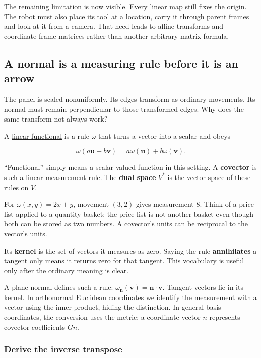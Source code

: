 The remaining limitation is now visible. Every linear map still fixes the origin. The robot must also place its tool at a location, carry it through parent frames and look at it from a camera. That need leads to affine transforms and coordinate-frame matrices rather than another arbitrary matrix formula.

\subsection{A normal is a measuring rule before it is an arrow}\label{01-foundations-i-ch018-a-normal-is-a-measuring-rule-before-it-is-an-arrow}

The panel is scaled nonuniformly. Its edges transform as ordinary movements. Its normal must remain perpendicular to those transformed edges. Why does the same transform not always work?

A \hyperref[01-foundations-i-ch019-normals-undo-scale-before-following-rotation]{linear functional} is a rule \(\omega\) that turns a vector into a scalar and obeys

\[
\omega(a\mathbf u+b\mathbf v)=a\omega(\mathbf u)+b\omega(\mathbf v).
\]

``Functional'' simply means a scalar-valued function in this setting. A \textbf{covector} is such a linear measurement rule. The \textbf{dual space} \(V^*\) is the vector space of these rules on \(V\).

For \(\omega(x,y)=2x+y\), movement \((3,2)\) gives measurement \(8\). Think of a price list applied to a quantity basket: the price list is not another basket even though both can be stored as two numbers. A covector's units can be reciprocal to the vector's units.

Its \textbf{kernel} is the set of vectors it measures as zero. Saying the rule \textbf{annihilates} a tangent only means it returns zero for that tangent. This vocabulary is useful only after the ordinary meaning is clear.

A plane normal defines such a rule: \(\omega_{\mathbf n}(\mathbf v)=\mathbf n\cdot\mathbf v\). Tangent vectors lie in its kernel. In orthonormal Euclidean coordinates we identify the measurement with a vector using the inner product, hiding the distinction. In general basis coordinates, the conversion uses the metric: a coordinate vector \(n\) represents covector coefficients \(Gn\).

\subsubsection{Derive the inverse transpose}\label{01-foundations-i-ch018-derive-the-inverse-transpose}

